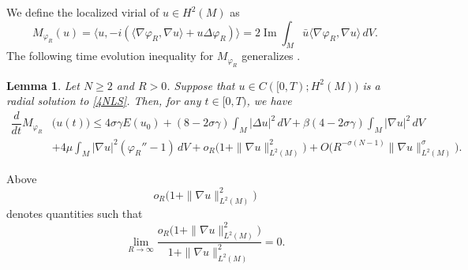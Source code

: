 \documentclass[10pt,leqno]{amsart}
\newtheorem{lem}{Lemma}[section]
\numberwithin{equation}{section}
\DeclareMathOperator{\im}{Im}
\begin{document}
We define the localized virial of $u\in H^2(M)$ as
\begin{equation}\label{def-vir}
M_{\varphi_R} (u)=\big\langle u, -i (\langle\nabla \varphi_R, \nabla u\rangle + u\Delta \varphi_R)\big\rangle = 2 \im \int_{M} \bar{u} \langle\nabla \varphi_R, \nabla u\rangle\, dV.
\end{equation} 
The following time evolution inequality for $M_{\varphi_R}$ generalizes \cite[Lemma 3.1]{bou-lenz}.
\begin{lem}\label{locvirest}
Let $N\geq 2$ and $R>0$. Suppose that $u\in C([0,T);H^2 (M))$ is a radial solution to \eqref{4NLS}. Then, for any $t\in [0,T)$, we have
\begin{align*}
\dfrac{d}{dt}M_{\varphi_R}& \big(u(t)\big) \leq 4 \sigma \gamma E (u_0)+(8-2\sigma \gamma) \int_M |\Delta u|^2\, dV +\beta (4-2\sigma \gamma ) \int_M |\nabla u|^2\, dV \\
&+ 4\mu \int_{M} |\nabla u|^2 (\varphi_R'' -1)\,dV +o_R \big(1+\|\nabla u\|^2_{L^2(M)}\big)+O\big( R^{-\sigma (N-1)} \|\nabla u\|_{L^2 (M)}^{\sigma}\big). 
\end{align*}
\end{lem}
Above 
\[
 o_R \big( 1 + \|\nabla u\|_{L^2 (M)}^2\big) 
 \] 
 denotes quantities such that 
 \[
 \lim_{R\rightarrow \infty}\frac{ o_R \big( 1 + \|\nabla u\|_{L^2 (M)}^2\big) }{ 1 + \|\nabla u\|_{L^2 (M)}^2 } =0 .
 \]
\end{document}
